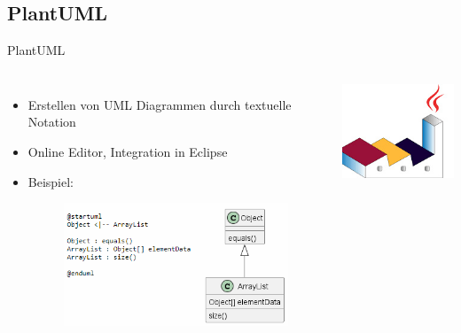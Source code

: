 \documentclass{sdqbeamer}
\begin{document}
\subsection{PlantUML}
\begin{frame}{PlantUML}
\begin{columns}
\begin{itemize}
\item Erstellen von UML Diagrammen durch textuelle Notation
\item Online Editor, Integration in Eclipse
\item Beispiel: 
\begin{figure}[t]
    \centering
    \includegraphics[width=.75\textwidth]{plantuml_beispiel.png}
\end{figure}
\end{itemize}

\includegraphics[width=.6\textwidth]{plantuml.jpg}
\end{columns}
\end{frame}
\end{document}
